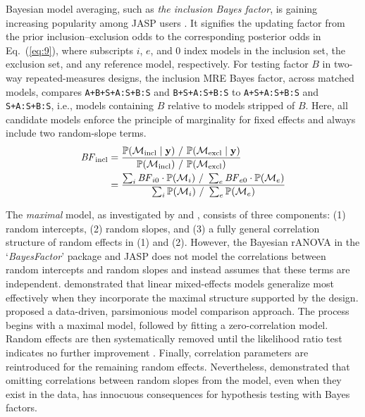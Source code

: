 \documentclass[preprint,12pt,authoryear]{elsarticle}
\begin{document}
Bayesian model averaging, such as \textit{the inclusion Bayes factor}, is gaining increasing popularity among JASP users \citep{hinne_conceptual_2020,mathot_bayes_2017}. It signifies the updating factor from the prior inclusion–exclusion odds to the corresponding posterior odds in Eq.~(\ref{eq:9}), where subscripts $i$, $e$, and 0 index models in the inclusion set, the exclusion set, and any reference model, respectively. For testing factor $B$ in two-way repeated-measures designs, the inclusion MRE Bayes factor, across matched models, compares \texttt{A+B+S+A:S+B:S} and \texttt{B+S+A:S+B:S} to \texttt{A+S+A:S+B:S} and \texttt{S+A:S+B:S}, i.e., models containing $B$ relative to models stripped of $B$. Here, all candidate models enforce the principle of marginality for fixed effects and always include two random-slope terms.
\begin{align}
	\mathit{BF}_{\text{incl}}&=\frac{\mathbb{P}(\mathcal{M}_{\text{incl}}\mid\mathbf{y})\ /\ \mathbb{P}(\mathcal{M}_{\text{excl}}\mid\mathbf{y})}{\mathbb{P}(\mathcal{M}_{\text{incl}})\ /\ \mathbb{P}(\mathcal{M}_{\text{excl}})} \notag \\
	&=\frac{\sum_{i}\mathit{BF}_{i0}\cdot\mathbb{P}(\mathcal{M}_i)\ /\ \sum_{e}\mathit{BF}_{e0}\cdot\mathbb{P}(\mathcal{M}_e)}{\sum_i\mathbb{P}(\mathcal{M}_i)\ /\ \sum_e\mathbb{P}(\mathcal{M}_e)} \label{eq:9}
\end{align}

The \textit{maximal} model, as investigated by \citet{bates_parsimonious_2015} and \citet{matuschek_balancing_2017}, consists of three components: (1) random intercepts, (2) random slopes, and (3) a fully general correlation structure of random effects in (1) and (2). However, the Bayesian rANOVA in the `\textit{BayesFactor}' package and JASP does not model the correlations between random intercepts and random slopes and instead assumes that these terms are independent. \citet{barr_random_2013} demonstrated that linear mixed-effects models generalize most effectively when they incorporate the maximal structure supported by the design. \citet[p.~12]{bates_parsimonious_2015} proposed a data-driven, parsimonious model comparison approach. The process begins with a maximal model, followed by fitting a zero-correlation model. Random effects are then systematically removed until the likelihood ratio test indicates no further improvement \citetext{%
	\citealp{bates_fitting_2015}; %
	\citealp[chap.~2.4]{pinheiro_mixed-effects_2000}; %
	\citealp{self_asymptotic_1987,stram_variance_1994}}.
Finally, correlation parameters are reintroduced for the remaining random effects. Nevertheless, \citet[Simulation 3]{oberauer_importance_2022} demonstrated that omitting correlations between random slopes from the model, even when they exist in the data, has innocuous consequences for hypothesis testing with Bayes factors.
\end{document}
